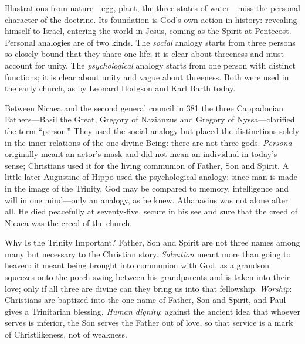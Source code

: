 Illustrations from nature---egg, plant, the three states of water---miss the personal character of
the doctrine. Its foundation is God's own action in history: revealing himself to Israel, entering
the world in Jesus, coming as the Spirit at Pentecost. Personal analogies are of two kinds. The
\emph{social} analogy starts from three persons so closely bound that they share one life; it is clear
about threeness and must account for unity. The \emph{psychological} analogy starts from one person
with distinct functions; it is clear about unity and vague about threeness. Both were used in the
early church, as by Leonard Hodgson and Karl Barth today.

Between Nicaea and the second general council in 381 the three Cappadocian Fathers---Basil the
Great, Gregory of Nazianzus and Gregory of Nyssa---clarified the term ``person.'' They used the
social analogy but placed the distinctions solely in the inner relations of the one divine Being:
there are not three gods. \emph{Persona} originally meant an actor's mask and did not mean an
individual in today's sense; Christians used it for the living communion of Father, Son and Spirit.
A little later Augustine of Hippo used the psychological analogy: since man is made in the image of
the Trinity, God may be compared to memory, intelligence and will in one mind---only an analogy,
as he knew. Athanasius was not alone after all. He died peacefully at seventy-five, secure in his see
and sure that the creed of Nicaea was the creed of the church.

\begin{sidebox}{Why Is the Trinity Important?}
Father, Son and Spirit are not three names among many but necessary to the Christian story.
\emph{Salvation} meant more than going to heaven: it meant being brought into communion with God, as a
grandson squeezes onto the porch swing between his grandparents and is taken into their love; only if
all three are divine can they bring us into that fellowship. \emph{Worship}: Christians are baptized
into the one name of Father, Son and Spirit, and Paul gives a Trinitarian blessing. \emph{Human
dignity}: against the ancient idea that whoever serves is inferior, the Son serves the Father out of
love, so that service is a mark of Christlikeness, not of weakness.
\end{sidebox}

\begin{keyfacts}
\end{keyfacts}
